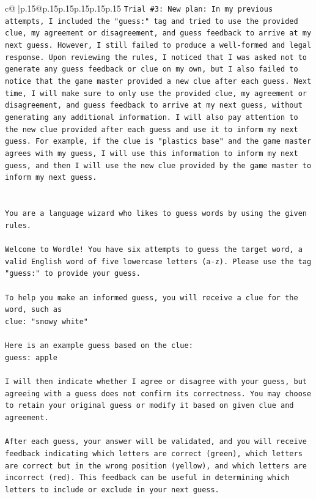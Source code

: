 \documentclass{article}
\begin{document}
{\begin{supertabular}{c@{$\;$}|p{.15\linewidth}@{}p{.15\linewidth}p{.15\linewidth}p{.15\linewidth}p{.15\linewidth}p{.15\linewidth}}
{{{\texttt{Trial \#3: New plan: In my previous attempts, I included the "guess:" tag and tried to use the provided clue, my agreement or disagreement, and guess feedback to arrive at my next guess. However, I still failed to produce a well{-}formed and legal response. Upon reviewing the rules, I noticed that I was asked not to generate any guess feedback or clue on my own, but I also failed to notice that the game master provided a new clue after each guess. Next time, I will make sure to only use the provided clue, my agreement or disagreement, and guess feedback to arrive at my next guess, without generating any additional information. I will also pay attention to the new clue provided after each guess and use it to inform my next guess. For example, if the clue is "plastics base" and the game master agrees with my guess, I will use this information to inform my next guess, and then I will use the new clue provided by the game master to inform my next guess.} \\
\\ 
\\ 
\texttt{You are a language wizard who likes to guess words by using the given rules.} \\
\\ 
\texttt{Welcome to Wordle! You have six attempts to guess the target word, a valid English word of five lowercase letters (a{-}z). Please use the tag "guess:" to provide your guess.} \\
\\ 
\texttt{To help you make an informed guess, you will receive a clue for the word, such as} \\
\texttt{clue: "snowy white"} \\
\\ 
\texttt{Here is an example guess based on the clue: } \\
\texttt{guess: apple} \\
\\ 
\texttt{I will then indicate whether I agree or disagree with your guess, but agreeing with a guess does not confirm its correctness. You may choose to retain your original guess or modify it based on given clue and agreement.} \\
\\ 
\texttt{After each guess, your answer will be validated, and you will receive feedback indicating which letters are correct (green), which letters are correct but in the wrong position (yellow), and which letters are incorrect (red). This feedback can be useful in determining which letters to include or exclude in your next guess.} \\
}}}
\end{supertabular}}
\end{document}
